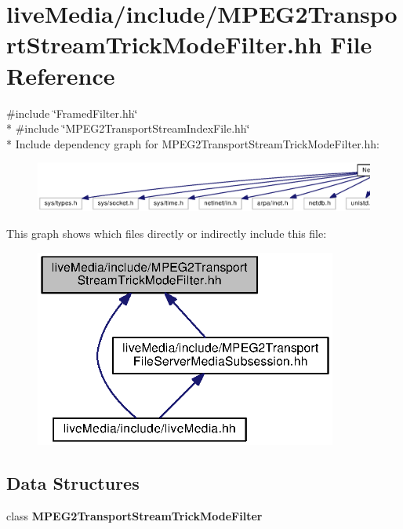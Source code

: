 \section{live\+Media/include/\+M\+P\+E\+G2\+Transport\+Stream\+Trick\+Mode\+Filter.hh File Reference}
\label{MPEG2TransportStreamTrickModeFilter_8hh}
{\ttfamily \#include \char`\"{}Framed\+Filter.\+hh\char`\"{}}\\*
{\ttfamily \#include \char`\"{}M\+P\+E\+G2\+Transport\+Stream\+Index\+File.\+hh\char`\"{}}\\*
Include dependency graph for M\+P\+E\+G2\+Transport\+Stream\+Trick\+Mode\+Filter.\+hh\+:
\nopagebreak
\begin{figure}[H]
\begin{center}
\leavevmode
\includegraphics[width=350pt]{MPEG2TransportStreamTrickModeFilter_8hh__incl}
\end{center}
\end{figure}
This graph shows which files directly or indirectly include this file\+:
\nopagebreak
\begin{figure}[H]
\begin{center}
\leavevmode
\includegraphics[width=282pt]{MPEG2TransportStreamTrickModeFilter_8hh__dep__incl}
\end{center}
\end{figure}
\subsection*{Data Structures}
\begin{DoxyCompactItemize}
\item 
class {\bf M\+P\+E\+G2\+Transport\+Stream\+Trick\+Mode\+Filter}
\end{DoxyCompactItemize}

